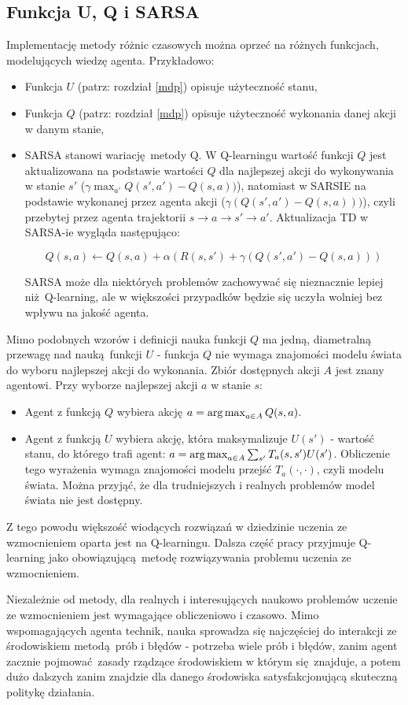 \subsection{Funkcja U, Q i SARSA}\label{qlearning}

Implementację metody różnic czasowych można oprzeć na różnych funkcjach, modelujących wiedzę agenta. Przykładowo:

\begin{itemize}
\item Funkcja $U$ (patrz: rozdział \ref{mdp}) opisuje użyteczność stanu,
\item Funkcja $Q$ (patrz: rozdział \ref{mdp}) opisuje użyteczność wykonania danej akcji w danym stanie,
\item SARSA stanowi wariację metody Q. W Q-learningu wartość funkcji $Q$ jest aktualizowana na podstawie wartości $Q$ dla najlepszej akcji do wykonywania w stanie $s'$ ($\gamma \max_{a'}Q(s',a') - Q (s,a))$), natomiast w SARSIE na podstawie wykonanej przez agenta akcji ($\gamma (Q(s',a') - Q (s,a)))$), czyli przebytej przez agenta trajektorii $ s \rightarrow a \rightarrow s' \rightarrow a'$. Aktualizacja TD w SARSA-ie wygląda następująco:

$$Q(s,a) \leftarrow Q(s,a) + \alpha (R(s,s') + \gamma (Q(s',a') - Q (s,a)))$$

SARSA może dla niektórych problemów zachowywać się nieznacznie lepiej niż Q-learning, ale w większości przypadków będzie się uczyła wolniej bez wpływu na jakość agenta.
\end{itemize}

Mimo podobnych wzorów i definicji nauka funkcji $Q$ ma jedną, diametralną przewagę nad nauką funkcji $U$ - funkcja $Q$ nie wymaga znajomości modelu świata do wyboru najlepszej akcji do wykonania. Zbiór dostępnych akcji $A$ jest znany agentowi. Przy wyborze najlepszej akcji $a$ w stanie $s$:
\begin{itemize}
\item Agent z funkcją $Q$ wybiera akcję $a = \operatorname{\arg \max}_{a \in A} Q(s,a)$.

\item Agent z funkcją $U$ wybiera akcję, która maksymalizuje $U(s')$ - wartość stanu, do którego trafi agent: $a = \operatorname{\arg \max}_{a \in A} \sum_{s'} T_a(s,s')U(s')$. Obliczenie tego wyrażenia wymaga znajomości modelu przejść $T_a(\cdot, \cdot)$, czyli modelu świata. Można przyjąć, że dla trudniejszych i realnych problemów model świata nie jest dostępny.
\end{itemize}

Z tego powodu większość wiodących rozwiązań w dziedzinie uczenia ze wzmocnieniem oparta jest na Q-learningu. Dalsza część pracy przyjmuje Q-learning jako obowiązującą metodę rozwiązywania problemu uczenia ze wzmocnieniem.

Niezależnie od metody, dla realnych i interesujących naukowo problemów uczenie ze wzmocnieniem jest wymagające obliczeniowo i czasowo. Mimo wspomagających agenta technik, nauka sprowadza się najczęściej do interakcji ze środowiskiem metodą prób i błędów - potrzeba wiele prób i błędów, zanim agent zacznie pojmować zasady rządzące środowiskiem w którym się znajduje, a potem dużo dalszych zanim znajdzie dla danego środowiska satysfakcjonującą skuteczną politykę działania.

